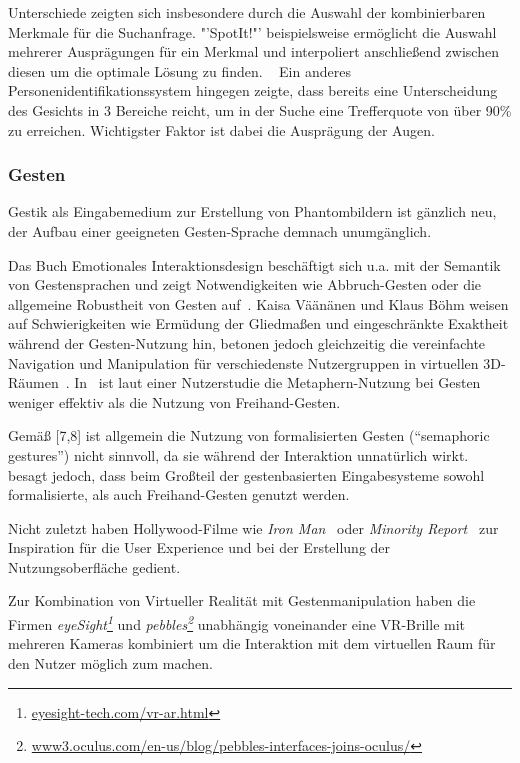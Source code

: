 \documentclass{sigchi-ext}
\begin{document}
Unterschiede zeigten sich insbesondere durch die Auswahl der kombinierbaren Merkmale für die Suchanfrage. "'SpotIt!"' beispielsweise ermöglicht die Auswahl mehrerer Ausprägungen für ein Merkmal und interpoliert anschließend zwischen diesen um die optimale Lösung zu finden. ~\cite{brunelli1996} Ein anderes Personenidentifikationssystem hingegen zeigte, dass bereits eine Unterscheidung des Gesichts in 3 Bereiche reicht, um in der Suche eine Trefferquote von über 90\% zu erreichen. Wichtigster Faktor ist dabei die Ausprägung der Augen. ~\cite{bobulski2012}

\subsubsection{Gesten}
Gestik als Eingabemedium zur Erstellung von Phantombildern ist gänzlich neu, der Aufbau einer geeigneten Gesten-Sprache demnach unumgänglich. 

Das Buch Emotionales Interaktionsdesign beschäftigt sich
 u.a. mit der Semantik von Gestensprachen und zeigt Notwendigkeiten wie Abbruch-Gesten oder die allgemeine Robustheit von Gesten auf~\cite{Dorau11}. Kaisa Väänänen und Klaus Böhm weisen auf Schwierigkeiten wie Ermüdung der Gliedma{\ss}en und eingeschränkte Exaktheit während der Gesten-Nutzung hin, betonen jedoch gleichzeitig die vereinfachte Navigation und Manipulation für verschiedenste Nutzergruppen in virtuellen 3D-Räumen~\cite{vrs:book}.
In~\cite{3dinteraction:book} ist laut einer Nutzerstudie die
Metaphern-Nutzung bei Gesten weniger effektiv als die Nutzung von
Freihand-Gesten. 

Gemä{\ss} [7,8] ist allgemein die Nutzung von formalisierten Gesten (``semaphoric gestures'') nicht sinnvoll, da sie während der Interaktion unnatürlich wirkt.
~\cite{3dinteraction:book} besagt jedoch, dass beim Gro{\ss}teil der
gestenbasierten Eingabesysteme sowohl formalisierte, als auch
Freihand-Gesten genutzt werden.

Nicht zuletzt haben Hollywood-Filme wie \textit{Iron Man}~\cite{ironman:movie} oder \textit{Minority Report}~\cite{minorityreport:movie} zur Inspiration für die User Experience und bei der Erstellung der Nutzungsoberfläche gedient.

Zur Kombination von Virtueller Realität mit Gestenmanipulation haben die Firmen \textit{eyeSight\footnote{\url{eyesight-tech.com/vr-ar.html}}} und 
\textit{pebbles\footnote{\url{www3.oculus.com/en-us/blog/pebbles-interfaces-joins-oculus/}}} unabhängig voneinander eine VR-Brille mit mehreren Kameras kombiniert um die Interaktion mit dem virtuellen Raum für den Nutzer möglich zum machen.
\end{document}
